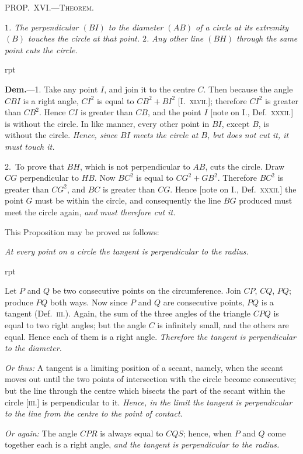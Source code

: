 \documentclass[oneside]{book}
\newcommand\mypropl[2]{
\bigskip\Needspace*{4\baselineskip}\begin{center}\textsc{#1}\end{center}
\hspace{\parindent}\emph{#2}\par\medskip
}
\newcommand\imgflow[3]{
\setcounter{wrapwidth}{#1}
\begin{wrapfigure}[#2]{r}{\value{wrapwidth}pt}
\begin{center}
\vspace{-0.3in}
\end{center}
\end{wrapfigure}
}
\begin{document}
\mypropl{PROP\@.~XVI\@.---Theorem.}{$1$. The perpendicular $(BI)$ to the diameter $(AB)$ of a
circle at its extremity $(B)$ touches the circle at that point.
$2$. Any other line $(BH)$ through the same point cuts the
circle.}

\imgflow{125}{10}{f121}

\textbf{Dem.}---1. Take any point $I$, and join it to the centre
$C$. Then because the angle $CBI$
is a right angle, $CI^{2}$ is equal to
$CB^{2} + BI^{2}$ [I.~\textsc{xlvii}.]; therefore
$CI^{2}$ is greater than $CB^{2}$. Hence
$CI$ is greater than $CB$, and the
point $I$ [note on I., Def.~\textsc{xxxii.}]
is without the circle. In like
manner, every other point in
$BI$, except $B$, is without the
circle. \emph{Hence, since $BI$ meets
the circle at $B$, but does not cut it, it must touch it.}

2.~To prove that $BH$, which is not perpendicular to
$AB$, cuts the circle. Draw $CG$ perpendicular to $HB$.
Now $BC^{2}$ is equal to $CG^{2} + GB^{2}$. Therefore $BC^{2}$ is
greater than $CG^{2}$, and $BC$ is greater than $CG$. Hence
[note on I., Def.~\textsc{xxxii.}] the point $G$ must be within
the circle, and consequently the line $BG$ produced
must meet the circle again, \emph{and must therefore cut it.}

This Proposition may be proved as follows:

\emph{At every point on a circle the tangent is perpendicular
to the radius.}


\imgflow{96}{7}{f122}
Let $P$ and $Q$ be two consecutive points on the circumference.
Join $CP$, $CQ$, $PQ$;
produce $PQ$ both ways. Now since
$P$ and $Q$ are consecutive points, $PQ$
is a tangent (Def.~\textsc{iii.}). Again, the
sum of the three angles of the triangle
$CPQ$ is equal to two right
angles; but the angle $C$ is infinitely
small, and the others are equal.
Hence each of them is a right angle. \textit{Therefore the
tangent is perpendicular to the diameter.}

\textit{Or thus:} A tangent is a limiting position of a secant,
namely, when the secant moves out until the two
points of intersection with the circle become consecutive;
but the line through the centre which bisects
the part of the secant within the circle [\textsc{iii.}] is perpendicular
to it. \textit{Hence, in the limit the tangent is
perpendicular to the line from the centre to the point
of contact.}

\textit{Or again:} The angle $CPR$ is always equal to $CQS$;
hence, when $P$ and $Q$ come together each is a right
angle, \textit{and the tangent is perpendicular to the radius.}
\end{document}
